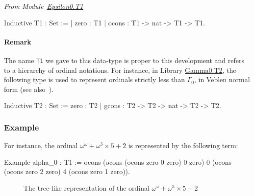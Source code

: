\vspace{4pt}
\noindent\emph{From Module~\href{../theories/html/hydras.Epsilon0.T1.html\#T1}{Epsilon0.T1}}

\label{types:T1}

\begin{Coqsrc}
Inductive T1 : Set  :=
| zero : T1
| ocons : T1 -> nat -> T1 -> T1.
\end{Coqsrc}



\paragraph{Remark}
The name \texttt{T1} we gave to this data-type  is proper to this development and refers
to a hierarchy of ordinal notations. For instance, in Library \href{../theories/html/hydras.Gamma0.T2.html}{Gamma0.T2},  the following type is used to represent ordinals strictly less than \(\Gamma_0\),  in Veblen normal form (see also~\cite{schutte}).
\noindent
\begin{Coqsrc}
Inductive T2 : Set :=
  zero : T2
| gcons : T2 -> T2 -> nat -> T2 -> T2.
\end{Coqsrc}

\subsubsection{Example}

\label{alpha0-def}
For instance, the ordinal  $\omega^\omega+\omega^3\times 5+2$ is represented by the following term:

\begin{Coqsrc}
Example alpha_0 : T1 :=
  ocons (ocons (ocons zero 0 zero)
               0
               zero)
        0
       (ocons (ocons zero 2 zero)
              4
              (ocons zero 1 zero)).
\end{Coqsrc}


\begin{figure}[htb]
\centering
{}

\caption{The tree-like representation of the ordinal $\omega^\omega+\omega^3\times 5 +2$\label{fig:cnf-tree}}

\end{figure}



